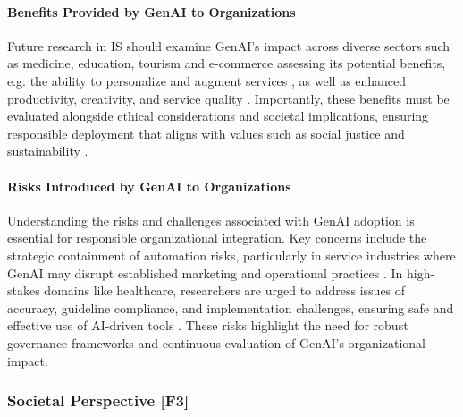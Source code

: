 \paragraph{Benefits Provided by GenAI to Organizations}
Future research in IS should examine GenAI’s impact across diverse sectors such as medicine, education, tourism and e-commerce \parencite{R07, S01, S14, S17} assessing its potential benefits, e.g. the ability to personalize and augment services \parencite{S17}, as well as enhanced productivity, creativity, and service quality \parencite{R02}. Importantly, these benefits must be evaluated alongside ethical considerations and societal implications, ensuring responsible deployment that aligns with values such as social justice and sustainability \parencite{R02, S17}.

\paragraph{Risks Introduced by GenAI to Organizations}
Understanding the risks and challenges associated with GenAI adoption is essential for responsible organizational integration. Key concerns include the strategic containment of automation risks, particularly in service industries where GenAI may disrupt established marketing and operational practices \parencite{R05, R08}. In high-stakes domains like healthcare, researchers are urged to address issues of accuracy, guideline compliance, and implementation challenges, ensuring safe and effective use of AI-driven tools \parencite{R09, S03}. These risks highlight the need for robust governance frameworks and continuous evaluation of GenAI’s organizational impact.

\subsubsection{Societal Perspective [F3]}

